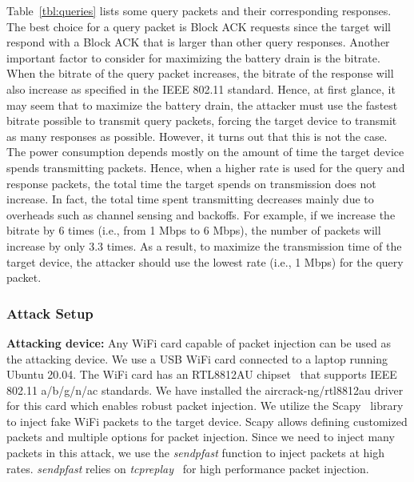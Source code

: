Table~\ref{tbl:queries} lists some query packets and their corresponding responses. The best choice for a query packet is Block ACK requests since the target will respond with a Block ACK that is larger than other query responses. Another important factor to consider for maximizing the battery drain is the bitrate.  When the bitrate of the query packet increases, the bitrate of the response will also increase as specified in the IEEE 802.11 standard. Hence, at first glance, it may seem that to maximize the battery drain, the attacker must use the fastest bitrate possible to transmit query packets, forcing the target device to transmit as many responses as possible. However, it turns out that this is not the case. The power consumption depends mostly on the amount of time the target device spends transmitting packets. Hence, when a higher rate is used for the query and response packets, the total time the target spends on transmission does not increase. In fact, the total time spent transmitting decreases mainly due to overheads such as channel sensing and backoffs. For example, if we increase the bitrate by 6 times (i.e., from 1 Mbps to 6 Mbps), the number of packets will increase by only 3.3 times. As a result, to maximize the transmission time of the target device, the attacker should use the lowest rate (i.e., 1 Mbps) for the query packet. 





\subsubsection{Attack Setup}
\vspace{0.05in}
\noindent

\noindent\textbf{Attacking device:}
Any WiFi card capable of packet injection can be used as the attacking device. We use a USB WiFi card connected to a laptop running Ubuntu 20.04. The WiFi card has an RTL8812AU chipset~\cite{rtl8812au} that supports IEEE 802.11 a/b/g/n/ac standards. We have installed the aircrack-ng/rtl8812au driver~\cite{aircrack-ng} for this card which enables robust packet injection. We utilize the Scapy~\cite{scapy} library to inject fake WiFi packets to the target device. 
Scapy allows defining customized packets and multiple options for packet injection. 
Since we need to inject many packets in this attack, we use the \textit{sendpfast} function to inject packets at high rates. \textit{sendpfast} relies on \textit{tcpreplay}~\cite{tcpreplay} for high performance packet injection. 

